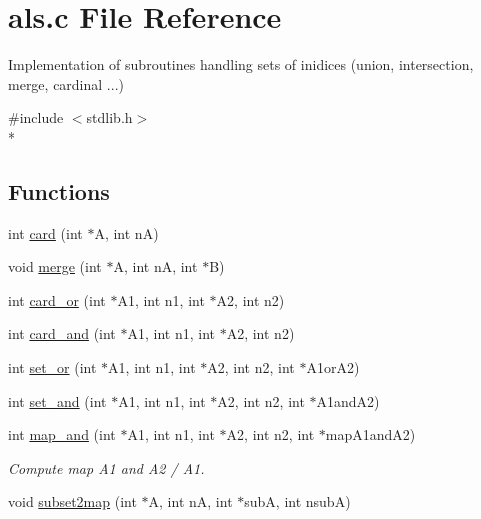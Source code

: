 \section{als.\-c File Reference}
\label{als_8c}


Implementation of subroutines handling sets of inidices (union, intersection, merge, cardinal ...)  


{\ttfamily \#include $<$stdlib.\-h$>$}\\*
\subsection*{Functions}
\begin{DoxyCompactItemize}
\item 
int \hyperlink{als_8c_a895e7767f67f48a41f62a83122f28960}{card} (int $\ast$A, int n\-A)
\item 
void \hyperlink{als_8c_a8e2ee6837f49affa2ec499bd74e1ddf6}{merge} (int $\ast$A, int n\-A, int $\ast$B)
\item 
int \hyperlink{als_8c_a53acb71f83d76d42080a2fd8b4ad06b1}{card\-\_\-or} (int $\ast$A1, int n1, int $\ast$A2, int n2)
\item 
int \hyperlink{als_8c_a67a8ef3c535fc47af99024fa2de0b3c5}{card\-\_\-and} (int $\ast$A1, int n1, int $\ast$A2, int n2)
\item 
int \hyperlink{als_8c_a07e3dbbce334f3744a3eb27174780a7c}{set\-\_\-or} (int $\ast$A1, int n1, int $\ast$A2, int n2, int $\ast$A1or\-A2)
\item 
int \hyperlink{als_8c_a3beac6a118c373a422f4772144306add}{set\-\_\-and} (int $\ast$A1, int n1, int $\ast$A2, int n2, int $\ast$A1and\-A2)
\item 
int \hyperlink{als_8c_a6f1b0726299f97bfb88c9edc2bdbe174}{map\-\_\-and} (int $\ast$A1, int n1, int $\ast$A2, int n2, int $\ast$map\-A1and\-A2)
\begin{DoxyCompactList}\small\item\em Compute map A1 and A2 / A1. \end{DoxyCompactList}\item 
void \hyperlink{als_8c_a9b54f87c099afc27b21911c553068651}{subset2map} (int $\ast$A, int n\-A, int $\ast$sub\-A, int nsub\-A)
\end{DoxyCompactItemize}


